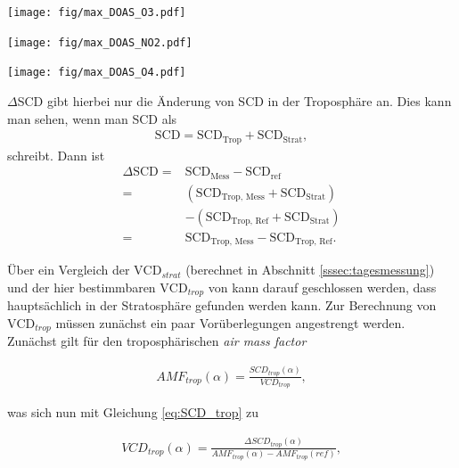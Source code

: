 \documentclass[12pt, a4paper, bibliography=totoc]{scrartcl}
\begin{document}
\begin{multicols}{2}
\begin{center}
	\texttt{[image: fig/max\_DOAS\_O3.pdf]}
	\label{fig:max_doas_o3}
\end{center}

\begin{center}
	\texttt{[image: fig/max\_DOAS\_NO2.pdf]}
	\label{fig:max_doas_no2}
\end{center}

\begin{center}
	\texttt{[image: fig/max\_DOAS\_O4.pdf]}
	\label{fig:max_doas_o4}
\end{center}

$\Delta$SCD gibt hierbei nur die Änderung von SCD in der Troposphäre an.
Dies kann man sehen, wenn man SCD als
\begin{align}
    \text{SCD} = \text{SCD}_\text{Trop} + \text{SCD}_\text{Strat},
\end{align}
schreibt.
Dann ist 
\begin{align}
\Delta\text{SCD} =& \text{SCD}_{\text{Mess}} - \text{SCD}_\text{ref} \\
    =& (\text{SCD}_{\text{Trop, \ Mess}} + \text{SCD}_{\text{Strat}}) \\
    & - (\text{SCD}_{\text{Trop, \ Ref}} + \text{SCD}_{\text{Strat}}) \\
    =& \text{SCD}_{\text{Trop, \ Mess}} - \text{SCD}_{\text{Trop, \ Ref}}. \label{eq:SCD_trop}
\end{align}

Über ein Vergleich der $\text{VCD}_{strat}$ (berechnet in Abschnitt \ref{sssec:tagesmessung})
und der hier bestimmbaren $\text{VCD}_{trop}$  von  kann darauf geschlossen werden, dass  hauptsächlich in der Stratosphäre gefunden werden kann.
Zur Berechnung von $\text{VCD}_{trop}$ müssen zunächst ein paar Vorüberlegungen angestrengt werden.
Zunächst gilt für den troposphärischen \textit{air mass factor}

\begin{align}
AMF_{trop}(\alpha) = \frac{SCD_{trop}(\alpha)}{VCD_{trop}},
\end{align}

was sich nun mit Gleichung \ref{eq:SCD_trop} zu 

\begin{align}
    VCD_{trop}(\alpha) = \frac{\Delta SCD_{trop}(\alpha)}{AMF_{trop}(\alpha)-AMF_{trop}(ref)}, 
\end{align} 


\end{multicols}
\end{document}
